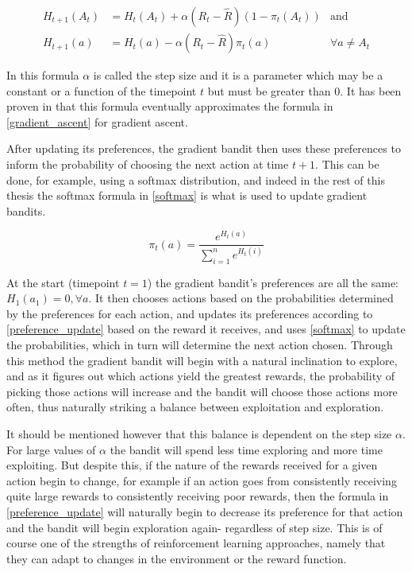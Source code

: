 \begin{align} \label{preference_update}
H_{t+1}(A_t) &= H_t(A_t) + \alpha (R_t - \hat{R}) (1 - \pi_t(A_t)) & \text{and} \\
H_{t+1}(a) &= H_t(a) - \alpha (R_t - \hat{R})\pi_t(a) & \forall a \neq A_t
\end{align}

In this formula $\alpha$ is called the step size and it is a parameter which may be a constant or a function of the timepoint $t$ but must be greater than 0. It has been proven in \cite{sutton_barto} that this formula eventually approximates the formula in \ref{gradient_ascent} for gradient ascent. 

After updating its preferences, the gradient bandit then uses these preferences to inform the probability of choosing the next action at time $t+1$. This can be done, for example, using a softmax distribution, and indeed in the rest of this thesis the softmax formula in \ref{softmax} is what is used to update gradient bandits.

\begin{equation}\label{softmax}
\pi_t(a) = \frac {e^{H_t(a)}} {\sum_{i=1}^n e^{H_t(i)}}
\end{equation}

At the start (timepoint $t = 1$) the gradient bandit’s preferences are all the same: $H_1(a_1) = 0 , \forall a$. It then chooses actions based on the probabilities determined by the preferences for each action, and updates its preferences according to \ref{preference_update} based on the reward it receives, and uses \ref{softmax} to update the probabilities, which in turn will determine the next action chosen. Through this method the gradient bandit will begin with a natural inclination to explore, and as it figures out which actions yield the greatest rewards, the probability of picking those actions will increase and the bandit will choose those actions more often, thus naturally striking a balance between exploitation and exploration. 

It should be mentioned however that this balance is dependent on the step size $\alpha$. For large values of $\alpha$ the bandit will spend less time exploring and more time exploiting. But despite this, if the nature of the rewards received for a given action begin to change, for example if an action goes from consistently receiving quite large rewards to consistently receiving poor rewards, then the formula in \ref{preference_update} will naturally begin to decrease its preference for that action and the bandit will begin exploration again- regardless of step size. This is of course one of the strengths of reinforcement learning approaches, namely that they can adapt to changes in the environment or the reward function.

